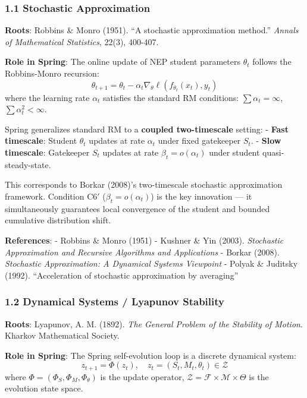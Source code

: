 \documentclass[
  12pt,
]{article}
\begin{document}
\subsubsection{1.1 Stochastic Approximation}\label{stochastic-approximation}

\textbf{Roots}: Robbins \& Monro (1951). ``A stochastic approximation method.'' \emph{Annals of Mathematical Statistics}, 22(3), 400-407.

\textbf{Role in Spring}: The online update of NEP student parameters $\theta_t$ follows the Robbins-Monro recursion:
\[\theta_{t+1} = \theta_t - \alpha_t \nabla_\theta \ell(f_{\theta_t}(x_t), y_t)\]
where the learning rate $\alpha_t$ satisfies the standard RM conditions: $\sum \alpha_t = \infty$, $\sum \alpha_t^2 < \infty$.

Spring generalizes standard RM to a \textbf{coupled two-timescale} setting:
- \textbf{Fast timescale}: Student $\theta_t$ updates at rate $\alpha_t$ under fixed gatekeeper $S_t$.
- \textbf{Slow timescale}: Gatekeeper $S_t$ updates at rate $\beta_t = o(\alpha_t)$ under student quasi-steady-state.

This corresponds to Borkar (2008)'s two-timescale stochastic approximation framework. Condition C6$'$ ($\beta_t = o(\alpha_t)$) is the key innovation --- it simultaneously guarantees local convergence of the student and bounded cumulative distribution shift.

\textbf{References}: - Robbins \& Monro (1951) - Kushner \& Yin (2003). \emph{Stochastic Approximation and Recursive Algorithms and Applications} - Borkar (2008). \emph{Stochastic Approximation: A Dynamical Systems Viewpoint} - Polyak \& Juditsky (1992). ``Acceleration of stochastic approximation by averaging''

\subsubsection{1.2 Dynamical Systems / Lyapunov Stability}\label{dynamical-systems-lyapunov}

\textbf{Roots}: Lyapunov, A. M. (1892). \emph{The General Problem of the Stability of Motion}. Kharkov Mathematical Society.

\textbf{Role in Spring}: The Spring self-evolution loop is a discrete dynamical system:
\[z_{t+1} = \Phi(z_t), \quad z_t = (S_t, M_t, \theta_t) \in \mathcal{Z}\]
where $\Phi = (\Phi_S, \Phi_M, \Phi_\theta)$ is the update operator, $\mathcal{Z} = \mathcal{F} \times \mathcal{M} \times \Theta$ is the evolution state space.
\end{document}
